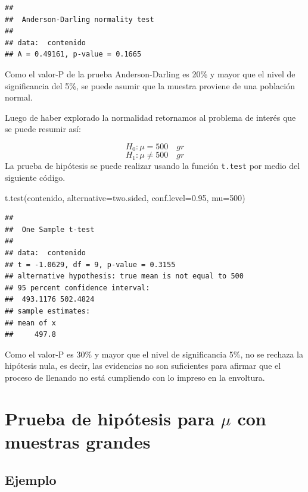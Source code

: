 \documentclass[
]{book}
\makeatletter
\newenvironment{Shaded}{\begin{snugshade}}{\end{snugshade}}
\newcommand{\AttributeTok}[1]{\textcolor[rgb]{0.77,0.63,0.00}{#1}}
\newcommand{\DecValTok}[1]{\textcolor[rgb]{0.00,0.00,0.81}{#1}}
\newcommand{\FloatTok}[1]{\textcolor[rgb]{0.00,0.00,0.81}{#1}}
\newcommand{\FunctionTok}[1]{\textcolor[rgb]{0.00,0.00,0.00}{#1}}
\newcommand{\NormalTok}[1]{#1}
\newcommand{\StringTok}[1]{\textcolor[rgb]{0.31,0.60,0.02}{#1}}
\newenvironment{kframe}{%
\medskip{}
\setlength{\fboxsep}{.8em}
 \def\at@end@of@kframe{}%
 \ifinner\ifhmode%
  \def\at@end@of@kframe{\end{minipage}}%
  \begin{minipage}{\columnwidth}%
 \fi\fi%
 \def\FrameCommand##1{\hskip\@totalleftmargin \hskip-\fboxsep
 \colorbox{shadecolor}{##1}\hskip-\fboxsep
     \hskip-\linewidth \hskip-\@totalleftmargin \hskip\columnwidth}%
 \MakeFramed {\advance\hsize-\width
   \@totalleftmargin\z@ \linewidth\hsize
   \@setminipage}}%
 {\par\unskip\endMakeFramed%
 \at@end@of@kframe}
\renewenvironment{Shaded}{\begin{kframe}}{\end{kframe}}
\makeatother
\begin{document}
\begin{verbatim}
## 
##  Anderson-Darling normality test
## 
## data:  contenido
## A = 0.49161, p-value = 0.1665
\end{verbatim}

Como el valor-P de la prueba Anderson-Darling es 20\% y mayor que el nivel de significancia del 5\%, se puede asumir que la muestra proviene de una población normal.

Luego de haber explorado la normalidad retornamos al problema de interés que se puede resumir así:

\[H_0: \mu = 500 \quad gr\]
\[H_1: \mu \neq 500 \quad gr\]
La prueba de hipótesis se puede realizar usando la función \texttt{t.test} por medio del siguiente código.

\begin{Shaded}
\begin{Highlighting}[]
\FunctionTok{t.test}\NormalTok{(contenido, }\AttributeTok{alternative=}\StringTok{\textquotesingle{}two.sided\textquotesingle{}}\NormalTok{,}
       \AttributeTok{conf.level=}\FloatTok{0.95}\NormalTok{, }\AttributeTok{mu=}\DecValTok{500}\NormalTok{)}
\end{Highlighting}
\end{Shaded}

\begin{verbatim}
## 
##  One Sample t-test
## 
## data:  contenido
## t = -1.0629, df = 9, p-value = 0.3155
## alternative hypothesis: true mean is not equal to 500
## 95 percent confidence interval:
##  493.1176 502.4824
## sample estimates:
## mean of x 
##     497.8
\end{verbatim}

Como el valor-P es 30\% y mayor que el nivel de significancia 5\%, no se rechaza la hipótesis nula, es decir, las evidencias no son suficientes para afirmar que el proceso de llenando no está cumpliendo con lo impreso en la envoltura.

\hypertarget{prueba-de-hipuxf3tesis-para-mu-con-muestras-grandes}{%
\section{\texorpdfstring{Prueba de hipótesis para \(\mu\) con muestras grandes}{Prueba de hipótesis para \textbackslash mu con muestras grandes}}\label{prueba-de-hipuxf3tesis-para-mu-con-muestras-grandes}}

\hypertarget{ejemplo-64}{%
\subsection*{Ejemplo}\label{ejemplo-64}}
\end{document}

